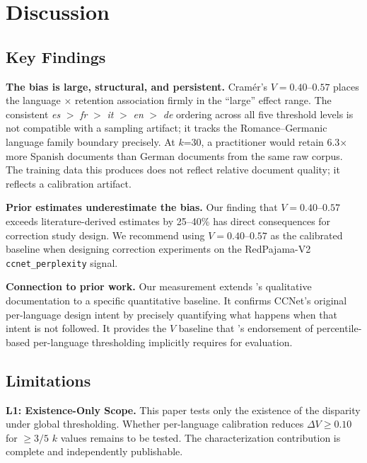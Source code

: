 \section{Discussion}
\label{sec:discussion}

\subsection{Key Findings}

\textbf{The bias is large, structural, and persistent.} Cram{\'e}r's $V = 0.40$--$0.57$ places the language $\times$ retention association firmly in the ``large'' effect range. The consistent \textit{es} $>$ \textit{fr} $>$ \textit{it} $>$ \textit{en} $>$ \textit{de} ordering across all five threshold levels is not compatible with a sampling artifact; it tracks the Romance--Germanic language family boundary precisely. At $k$=30, a practitioner would retain 6.3$\times$ more Spanish documents than German documents from the same raw corpus. The training data this produces does not reflect relative document quality; it reflects a calibration artifact.

\textbf{Prior estimates underestimate the bias.} Our finding that $V = 0.40$--$0.57$ exceeds literature-derived estimates by 25--40\% has direct consequences for correction study design. We recommend using $V = 0.40$--$0.57$ as the calibrated baseline when designing correction experiments on the RedPajama-V2 \texttt{ccnet\_perplexity} signal.

\textbf{Connection to prior work.} Our measurement extends \citet{Caswell2021Quality}'s qualitative documentation to a specific quantitative baseline. It confirms CCNet's original per-language design intent \cite{Wenzek2019CCNet} by precisely quantifying what happens when that intent is not followed. It provides the $V$ baseline that \citet{Turki2026CrossLingual}'s endorsement of percentile-based per-language thresholding implicitly requires for evaluation.

\subsection{Limitations}

\textbf{L1: Existence-Only Scope.} This paper tests only the existence of the disparity under global thresholding. Whether per-language calibration reduces $\Delta V \geq 0.10$ for $\geq 3/5$ $k$ values remains to be tested. The characterization contribution is complete and independently publishable.

